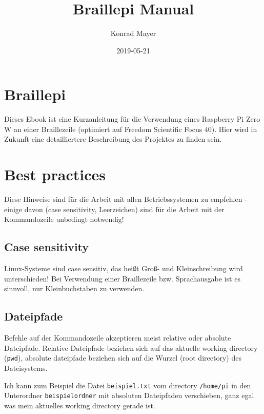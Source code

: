 \documentclass[]{book}
\title{Braillepi Manual}
\author{Konrad Mayer}
\date{2019-05-21}
\begin{document}
\maketitle

{
\setcounter{tocdepth}{1}
\tableofcontents
}
\hypertarget{braillepi}{%
\chapter{Braillepi}\label{braillepi}}

Dieses Ebook ist eine Kurzanleitung für die Verwendung eines Raspberry Pi Zero W an einer Braillezeile (optimiert auf Freedom Scientific Focus 40).
Hier wird in Zukunft eine detailliertere Beschreibung des Projektes zu finden sein.

\hypertarget{best-practices}{%
\chapter{Best practices}\label{best-practices}}

Diese Hinweise sind für die Arbeit mit allen Betriebssystemen zu empfehlen - einige davon (case sensitivity, Leerzeichen) sind für die Arbeit mit der Kommandozeile unbedingt notwendig!

\hypertarget{case-sensitivity}{%
\section{Case sensitivity}\label{case-sensitivity}}

Linux-Systeme sind case sensitiv, das heißt Groß- und Kleinschreibung wird unterschieden! Bei Verwendung einer Braillezeile bzw. Sprachausgabe ist es sinnvoll, nur Kleinbuchstaben zu verwenden.

\hypertarget{dateipfade}{%
\section{Dateipfade}\label{dateipfade}}

Befehle auf der Kommandozeile akzeptieren meist relative oder absolute Dateipfade. Relative Dateipfade beziehen sich auf das aktuelle working directory (\texttt{pwd}), absolute dateipfade beziehen sich auf die Wurzel (root directory) des Dateisystems.

Ich kann zum Beispiel die Datei \texttt{beispiel.txt} vom directory \texttt{/home/pi} in den Unterordner \texttt{beispielordner} mit absoluten Dateipfaden verschieben, ganz egal was mein aktuelles working directory gerade ist.
\end{document}
